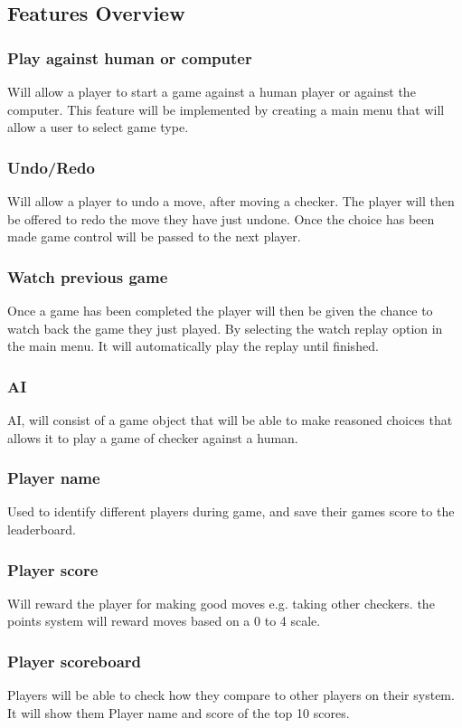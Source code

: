 \documentclass[10pt, a4paper]{article}
\begin{document}
 \subsection {Features Overview}
 \subsubsection  {Play against human or computer}
	Will allow a player to start a game against a human player or against the computer. This feature will be implemented by creating a main menu that will allow a user to select game type. 
 \subsubsection  {Undo/Redo}
	Will allow a player to undo a move, after moving a checker. The player will then be offered to redo the move they have just undone. Once the choice has been made game control will be passed to the next player.
 \subsubsection  {Watch previous game}
	Once a game has been completed the player will then be given the chance to watch back the game they just played. By selecting the watch replay option in the main menu. It will automatically play the replay until finished.
\subsubsection  {AI}
	AI, will consist of a game object that will be able to make reasoned choices that allows it to play a game of checker against a human.
\subsubsection  {Player name}
	Used to identify different players during game, and save their games score to the leaderboard.
\subsubsection  {Player score}
	Will reward the player for making good moves e.g. taking other checkers. the points system will reward moves based on a 0 to 4 scale.
\subsubsection  {Player scoreboard}
	Players will be able to check how they compare to other players on their system. It will show them Player name and score of the top 10 scores.
\end{document}
